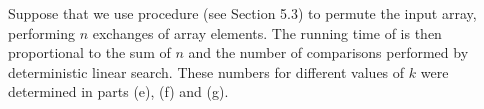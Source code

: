 Suppose that we use procedure  (see Section 5.3) to permute the input array, performing $n$ exchanges of array elements.
The running time of  is then proportional to the sum of $n$ and the number of comparisons performed by deterministic linear search.
These numbers for different values of $k$ were determined in parts (e), (f) and (g).
